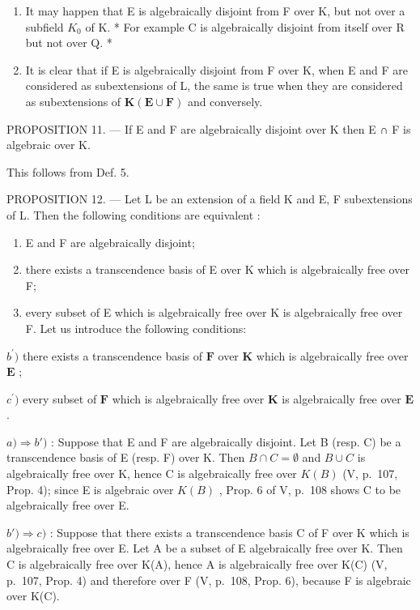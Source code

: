 \begin{enumerate}
\def\labelenumi{\arabic{enumi})}
\setcounter{enumi}{1}
\item
  It may happen that E is algebraically disjoint from F over K, but not over a subfield \(K_{0}\) of K. * For example C is algebraically disjoint from itself over R but not over Q. *
\item
  It is clear that if E is algebraically disjoint from F over K, when E and F are considered as subextensions of L, the same is true when they are considered as subextensions of \(\mathbf{K}(\mathbf{E} \cup \mathbf{F})\) and conversely.
\end{enumerate}

PROPOSITION 11. --- If E and F are algebraically disjoint over K then E ∩ F is algebraic over K.

This follows from Def. 5.

PROPOSITION 12. --- Let L be an extension of a field K and E, F subextensions of L. Then the following conditions are equivalent :

\begin{enumerate}
\def\labelenumi{\alph{enumi})}
\item
  E and F are algebraically disjoint;
\item
  there exists a transcendence basis of E over K which is algebraically free over F;
\item
  every subset of E which is algebraically free over K is algebraically free over F. Let us introduce the following conditions:
\end{enumerate}

\(b^{\prime})\) there exists a transcendence basis of \(\mathbf{F}\) over \(\mathbf{K}\) which is algebraically free over \(\mathbf{E}\) ;

\(c^{\prime})\) every subset of \(\mathbf{F}\) which is algebraically free over \(\mathbf{K}\) is algebraically free over \(\mathbf{E}\) .

\(a) \Rightarrow b')\) : Suppose that E and F are algebraically disjoint. Let B (resp. C) be a transcendence basis of E (resp. F) over K. Then \(B \cap C = \emptyset\) and \(B \cup C\) is algebraically free over K, hence C is algebraically free over \(K(B)\) (V, p.~107, Prop. 4); since E is algebraic over \(K(B)\) , Prop. 6 of V, p.~108 shows C to be algebraically free over E.

\(b') \Rightarrow c)\) : Suppose that there exists a transcendence basis C of F over K which is algebraically free over E. Let A be a subset of E algebraically free over K. Then C is algebraically free over K(A), hence A is algebraically free over K(C) (V, p.~107, Prop. 4) and therefore over F (V, p.~108, Prop. 6), because F is algebraic over K(C).

